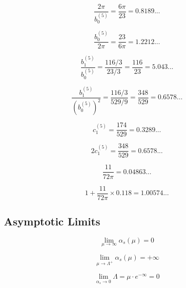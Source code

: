 \documentclass[11pt,a4paper]{article}
\theoremstyle{definition}
\begin{document}
\begin{equation}
\label{eq:add-49}
\frac{2\pi}{b_0^{(5)}} = \frac{6\pi}{23} = 0.8189...
\end{equation}

\begin{equation}
\label{eq:add-50}
\frac{b_0^{(5)}}{2\pi} = \frac{23}{6\pi} = 1.2212...
\end{equation}

\begin{equation}
\label{eq:add-51}
\frac{b_1^{(5)}}{b_0^{(5)}} = \frac{116/3}{23/3} = \frac{116}{23} = 5.043...
\end{equation}

\begin{equation}
\label{eq:add-52}
\frac{b_1^{(5)}}{(b_0^{(5)})^2} = \frac{116/3}{529/9} = \frac{348}{529} = 0.6578...
\end{equation}

\begin{equation}
\label{eq:add-53}
c_1^{(5)} = \frac{174}{529} = 0.3289...
\end{equation}

\begin{equation}
\label{eq:add-54}
2c_1^{(5)} = \frac{348}{529} = 0.6578...
\end{equation}

\begin{equation}
\label{eq:add-55}
\frac{11}{72\pi} = 0.04863...
\end{equation}

\begin{equation}
\label{eq:add-56}
1 + \frac{11}{72\pi} \times 0.118 = 1.00574...
\end{equation}

\subsection{Asymptotic Limits}
\label{subsec:add-asymptotic}

\begin{equation}
\label{eq:add-57}
\lim_{\mu\to\infty} \alpha_s(\mu) = 0
\end{equation}

\begin{equation}
\label{eq:add-58}
\lim_{\mu\to\Lambda^+} \alpha_s(\mu) = +\infty
\end{equation}

\begin{equation}
\label{eq:add-59}
\lim_{\alpha_s\to 0} \Lambda = \mu \cdot e^{-\infty} = 0
\end{equation}
\end{document}
